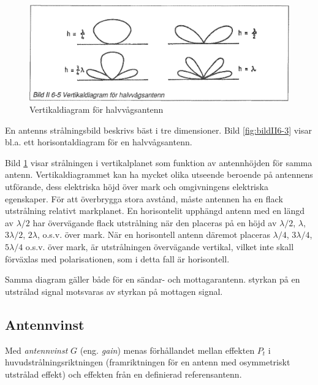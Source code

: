 \begin{figure}
  \includegraphics[width=\textwidth]{images/bild_2_6-05}
  \caption{Vertikaldiagram för halvvågsantenn}
  \label{fig:bildII6-5}
\end{figure}

En antenns strålningsbild beskrivs bäst i tre dimensioner. Bild \ref{fig:bildII6-3}
visar bl.a. ett horisontaldiagram för en halvvågsantenn.

Bild \ref{fig:bildII6-5} visar strålningen i vertikalplanet som funktion av
antennhöjden för samma antenn. Vertikaldiagrammet kan ha mycket olika
utseende beroende på antennens utförande, dess elektriska höjd över
mark och omgivningens elektriska egenskaper. För att överbrygga stora
avstånd, måste antennen ha en flack utstrålning relativt
markplanet. En horisontelit upphängd antenn med en längd av
\(\lambda/2\) har övervägande flack utstrålning när den placeras på en
höjd av \(\lambda/2\), \(\lambda\), \(3\lambda/2\), \(2\lambda\),
o.s.v. över mark. När en horisontell antenn däremot placeras
\(\lambda/4\), \(3\lambda/4\), \(5\lambda/4\) o.s.v. över mark, är
utstrålningen övervägande vertikal, vilket inte skall förväxlas med
polarisationen, som i detta fall är horisontell.

Samma diagram gäller både för en sändar- och mottagarantenn. styrkan
på en utstrålad signal motsvaras av styrkan på mottagen signal.

\subsection{Antennvinst}

Med \emph{antennvinst} \(G\) (eng. \emph{gain}) menas förhållandet mellan effekten
\(P_t\) i huvudstrålningsriktningen (framriktningen för en antenn med
osymmetriskt utstrålad effekt) och effekten från en definierad
referensantenn.

